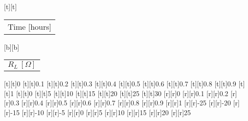 %
%
[t][t]{\color[rgb]{0,0,0}\setlength{\tabcolsep}{0pt}\begin{tabular}{c}Time [hours]\end{tabular}}%
[b][b]{\color[rgb]{0,0,0}\setlength{\tabcolsep}{0pt}\begin{tabular}{c}$R_L\ [\Omega]$\end{tabular}}%
%
[t][t]{0}%
[t][t]{0.1}%
[t][t]{0.2}%
[t][t]{0.3}%
[t][t]{0.4}%
[t][t]{0.5}%
[t][t]{0.6}%
[t][t]{0.7}%
[t][t]{0.8}%
[t][t]{0.9}%
[t][t]{1}%
[t][t]{0}%
[t][t]{5}%
[t][t]{10}%
[t][t]{15}%
[t][t]{20}%
[t][t]{25}%
[t][t]{30}%
%
[r][r]{0}%
[r][r]{0.1}%
[r][r]{0.2}%
[r][r]{0.3}%
[r][r]{0.4}%
[r][r]{0.5}%
[r][r]{0.6}%
[r][r]{0.7}%
[r][r]{0.8}%
[r][r]{0.9}%
[r][r]{1}%
[r][r]{-25}%
[r][r]{-20}%
[r][r]{-15}%
[r][r]{-10}%
[r][r]{-5}%
[r][r]{0}%
[r][r]{5}%
[r][r]{10}%
[r][r]{15}%
[r][r]{20}%
[r][r]{25}%
%
%
